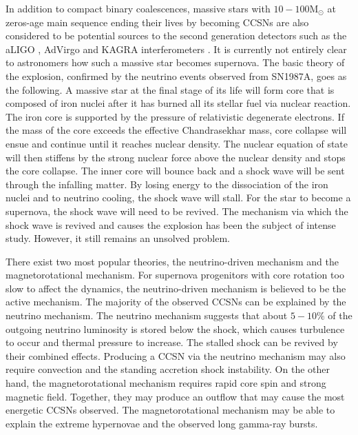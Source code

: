 \documentclass[aps,twocolumn,showpacs,groupedaddress, nofootinbib]{revtex4}  %
\begin{document}
In addition to compact binary coalescences, massive stars with $10-100 \text{M}_\odot $ at zeros-age main sequence ending their lives by becoming 
\acp{CCSN} are also considered to be potential sources to the second generation detectors such as the \ac{aLIGO} \cite{aasi2015advanced}, 
\ac{AdVirgo} \cite{acernese2014advanced} and KAGRA interferometers \cite{aso2013interferometer, gossan2016observing, abbott2016first}.
It is currently not entirely clear to astronomers how such a massive star becomes supernova. 
The basic theory of the explosion, confirmed by the neutrino events observed from SN1987A\cite{sato1987analysis}, goes as the following.
A massive star at the final stage of its life will form core that is composed of iron nuclei after it has burned all its stellar fuel via nuclear reaction.
The iron core is supported by the pressure of relativistic degenerate electrons.
If the mass of the core exceeds the effective Chandrasekhar mass\cite{baron1990effect, bethe1990supernova}, core collapse will ensue and continue until it reaches nuclear density.
The nuclear equation of state will then stiffens by the strong nuclear force above the nuclear density and stops 
the core collapse.
The inner core will bounce back and a shock wave will be sent through the infalling matter.
By losing energy to the dissociation of the iron nuclei and to neutrino cooling, the shock wave will stall.
For the star to become a supernova, the shock wave will need to be revived\cite{o2011black}.  
The mechanism via which the shock wave is revived and causes the explosion has been the subject of intense study.
However, it still remains an unsolved problem.

There exist two most popular theories, the neutrino-driven mechanism\cite{bethe1985revival, bethe1990supernova} and the magnetorotational mechanism\cite{janka2012explosion, kotake2012core, mezzacappa2014two}.
For supernova progenitors with core rotation too slow to affect the dynamics\cite{takiwaki2016three, summa2018rotation}, the neutrino-driven mechanism is believed to be the active mechanism.
The majority of the observed \acp{CCSN} can be explained by the neutrino mechanism\cite{bruenn2016development}.
The neutrino mechanism\cite{bethe1985revival, janka2007theory} suggests that about $5-10\%$ of the outgoing neutrino luminosity is stored below the shock, 
which causes turbulence to occur and thermal pressure to increase.
The stalled shock can be revived by their combined effects\cite{couch2015role}. 
Producing a \ac{CCSN} via the neutrino mechanism may also require convection and the standing accretion shock instability\cite{blondin2003stability}.
On the other hand, the magnetorotational mechanism requires rapid core spin and strong magnetic field\cite{leblanc1970numerical, burrows2007simulations, takiwaki2009special, moiseenko2006magnetorotational,mosta2014magnetorotational}. 
Together, they may produce an outflow that may cause the most energetic \acp{CCSN} observed.
The magnetorotational mechanism may be able to explain the extreme hypernovae and the observed long gamma-ray bursts\cite{woosley2006progenitor, yoon2005evolution, de2013rotation}.
 
\end{document}
